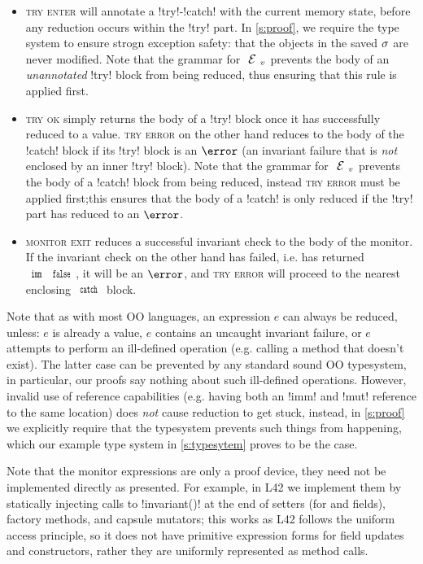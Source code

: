 \begin{itemize}
\item \textsc{try enter} will annotate a \Q!try!-\Q!catch! with the current memory state, before any reduction occurs within the \Q!try! part. In \ref{s:proof}, we require the type system to ensure strogn exception safety: that the objects in the saved $\sigma$ are never modified. Note that the grammar for $\EV$ prevents the body of an \emph{unannotated} \Q!try! block from being reduced, thus ensuring that this rule is applied first.

\item \textsc{try ok} simply returns the body of a \Q!try! block once it has successfully reduced to a value. \textsc{try error} on the other hand reduces to the body of the \Q!catch! block if its \Q!try! block is an $\error$ (an invariant failure that is \emph{not} enclosed by an inner \Q!try! block). Note that the grammar for $\EV$ prevents the body of a \Q!catch! block from being reduced, instead \textsc{try error} must be applied first;this ensures that the body of a \Q!catch! is only reduced if the \Q!try! part has reduced to an $\error$.

\item \textsc{monitor exit} reduces a successful invariant check to the body of the monitor. If the invariant check on the other hand has failed, i.e. has returned $\Kw{imm}\,\Kw{false}$, it will be an $\error$, and \textsc{try error} will proceed to the nearest enclosing $\Kw{catch}$ block.
\end{itemize}

Note that as with most OO languages, an expression $e$ can always be reduced, unless: $e$ is already a value, $e$ contains an uncaught invariant failure, or $e$ attempts to perform an ill-defined operation (e.g. calling a method that doesn't exist). The latter case can be prevented by any standard sound OO typesystem, in particular, our proofs say nothing about such ill-defined operations.
However, invalid use of reference capabilities (e.g. having both an \Q!imm! and \Q!mut! reference to the same location) does \emph{not} cause reduction to get stuck, instead, in \ref{s:proof} we explicitly require that the typesystem prevents such things from happening, which our example type system in \ref{s:typesytem} proves to be the case.

Note that the monitor expressions are only a proof device, they need not be implemented directly as presented.
For example, in L42 we implement them by statically injecting calls to \Q!invariant()! at the end of setters (for \Q@imm@ and \Q@rep@ fields), factory methods, and capsule mutators; this works as L42 follows the uniform access principle, so it does not have primitive expression forms for field updates and constructors, rather they are uniformly represented as method calls.

